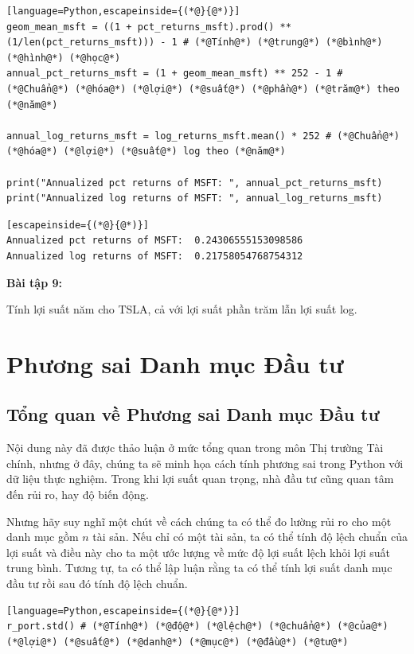 \begin{lstlisting}[language=Python,escapeinside={(*@}{@*)}]
geom_mean_msft = ((1 + pct_returns_msft).prod() ** (1/len(pct_returns_msft))) - 1 # (*@Tính@*) (*@trung@*) (*@bình@*) (*@hình@*) (*@học@*)
annual_pct_returns_msft = (1 + geom_mean_msft) ** 252 - 1 # (*@Chuẩn@*) (*@hóa@*) (*@lợi@*) (*@suất@*) (*@phần@*) (*@trăm@*) theo (*@năm@*)

annual_log_returns_msft = log_returns_msft.mean() * 252 # (*@Chuẩn@*) (*@hóa@*) (*@lợi@*) (*@suất@*) log theo (*@năm@*)

print("Annualized pct returns of MSFT: ", annual_pct_returns_msft)
print("Annualized log returns of MSFT: ", annual_log_returns_msft)
\end{lstlisting}

\begin{lstlisting}[escapeinside={(*@}{@*)}]
Annualized pct returns of MSFT:  0.24306555153098586
Annualized log returns of MSFT:  0.21758054768754312
\end{lstlisting}

\textbf{Bài tập 9:}

Tính lợi suất năm cho TSLA, cả với lợi suất phần trăm lẫn lợi suất log.

\section{Phương sai Danh mục Đầu tư}

\subsection{Tổng quan về Phương sai Danh mục Đầu tư}

Nội dung này đã được thảo luận ở mức tổng quan trong môn Thị trường Tài chính, nhưng ở đây, chúng ta sẽ minh họa cách tính phương sai trong Python với dữ liệu thực nghiệm. Trong khi lợi suất quan trọng, nhà đầu tư cũng quan tâm đến rủi ro, hay độ biến động.

Nhưng hãy suy nghĩ một chút về cách chúng ta có thể đo lường rủi ro cho một danh mục gồm $n$ tài sản. Nếu chỉ có một tài sản, ta có thể tính độ lệch chuẩn của lợi suất và điều này cho ta một ước lượng về mức độ lợi suất lệch khỏi lợi suất trung bình. Tương tự, ta có thể lập luận rằng ta có thể tính lợi suất danh mục đầu tư rồi sau đó tính độ lệch chuẩn.

\begin{lstlisting}[language=Python,escapeinside={(*@}{@*)}]
r_port.std() # (*@Tính@*) (*@độ@*) (*@lệch@*) (*@chuẩn@*) (*@của@*) (*@lợi@*) (*@suất@*) (*@danh@*) (*@mục@*) (*@đầu@*) (*@tư@*)
\end{lstlisting}

